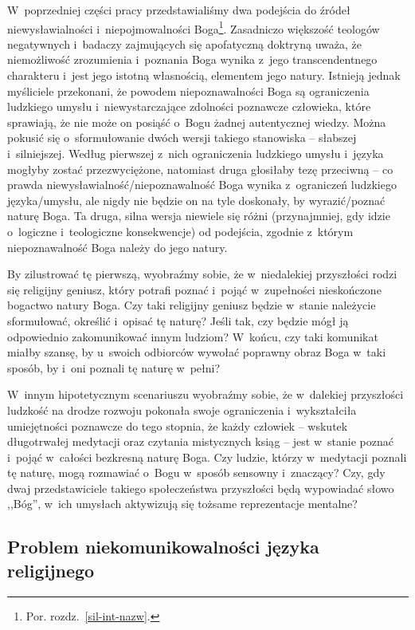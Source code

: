 W~poprzedniej części pracy przedstawialiśmy dwa podejścia do źródeł niewysławialności i~niepojmowalności Boga\footnote{Por. rozdz.~\ref{sil-int-nazw}.}. Zasadniczo większość teologów negatywnych i~badaczy zajmujących się apofatyczną doktryną uważa, że niemożliwość zrozumienia i~poznania Boga wynika z~jego transcendentnego charakteru i~jest jego istotną własnością, elementem jego natury. Istnieją jednak myśliciele przekonani, że powodem niepoznawalności Boga są ograniczenia ludzkiego umysłu i~niewystarczające zdolności poznawcze człowieka, które sprawiają, że nie może on posiąść o~Bogu żadnej autentycznej wiedzy. Można pokusić się o~sformułowanie dwóch wersji takiego stanowiska -- słabszej i~silniejszej. Według pierwszej z~nich ograniczenia ludzkiego umysłu i~języka mogłyby zostać przezwyciężone, natomiast druga głosiłaby tezę przeciwną -- co prawda niewysławialność/niepoznawalność Boga wynika z~ograniczeń ludzkiego języka/umysłu, ale nigdy nie będzie on na tyle doskonały, by wyrazić/poznać naturę Boga. Ta druga, silna wersja niewiele się różni (przynajmniej, gdy idzie o~logiczne i~teologiczne konsekwencje) od podejścia, zgodnie z~którym niepoznawalność Boga należy do jego natury.

By zilustrować tę pierwszą, wyobraźmy sobie, że w~niedalekiej przyszłości rodzi się religijny geniusz, który potrafi poznać i~pojąć w~zupełności nieskończone bogactwo natury Boga. Czy taki religijny geniusz będzie w~stanie należycie sformułować, określić i~opisać tę naturę? Jeśli tak, czy będzie mógł ją odpowiednio zakomunikować innym ludziom? W~końcu, czy taki komunikat miałby szansę, by u~swoich odbiorców wywołać poprawny obraz Boga w~taki sposób, by i~oni poznali tę naturę w~pełni?

W~innym hipotetycznym scenariuszu wyobraźmy sobie, że w~dalekiej przyszłości ludzkość na drodze rozwoju pokonała swoje ograniczenia i~wykształciła umiejętności poznawcze do tego stopnia, że każdy człowiek -- wskutek długotrwałej medytacji oraz czytania mistycznych ksiąg -- jest w~stanie poznać i~pojąć w~całości bezkresną naturę Boga. Czy ludzie, którzy w~medytacji poznali tę naturę, mogą rozmawiać o~Bogu w~sposób sensowny i~znaczący? Czy, gdy dwaj przedstawiciele takiego społeczeństwa przyszłości będą wypowiadać słowo ,,Bóg'', w~ich umysłach aktywizują się tożsame reprezentacje mentalne?


\subsection{Problem niekomunikowalności języka religijnego}\label{scep-nkom}

